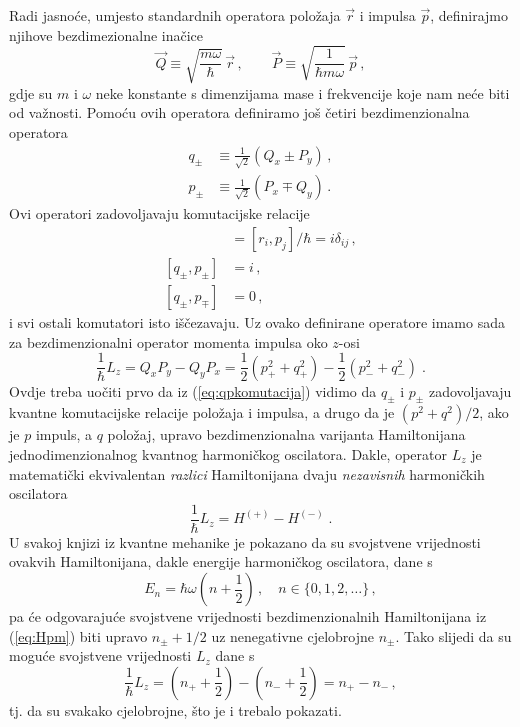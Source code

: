 Radi jasnoće, umjesto standardnih operatora položaja $\vec{r}$
i impulsa $\vec{p}$, definirajmo njihove bezdimezionalne inačice
\begin{equation}
    \vec{Q} \equiv \sqrt{\frac{m \omega}{\hbar}} \,\vec{r} \,, \qquad
    \vec{P} \equiv \sqrt{\frac{1}{\hbar m \omega}} \, \vec{p} \,,
\end{equation}
gdje su $m$ i $\omega$ neke konstante s dimenzijama mase i frekvencije
koje nam neće biti od važnosti. Pomoću ovih operatora definiramo 
još četiri bezdimenzionalna operatora
\begin{align}
    q_{\pm}& \equiv \frac{1}{\sqrt{2}} (Q_x \pm P_y) \,, \\
    p_{\pm}& \equiv \frac{1}{\sqrt{2}} (P_x \mp Q_y) \,.
\end{align}
Ovi operatori zadovoljavaju komutacijske relacije
\begin{align}
    [Q_i, P_j]& =  [r_i, p_j] / \hbar = i \delta_{ij} \,, \\
    [q_{\pm}, p_{\pm}]& = i \,, \label{eq:qpkomutacija}\\
    [q_{\pm}, p_{\mp}]& = 0 \,,
\end{align}
i svi ostali komutatori isto iščezavaju. Uz ovako definirane
operatore imamo sada za bezdimenzionalni operator momenta impulsa
oko $z$-osi
\begin{equation}
    \frac{1}{\hbar} L_z = Q_x P_y - Q_y P_x = \frac{1}{2}(p_{+}^2 + q_{+}^2)
                   - \frac{1}{2}(p_{-}^2 + q_{-}^2) \;.
\end{equation}
Ovdje treba uočiti prvo da iz (\ref{eq:qpkomutacija}) vidimo da
$q_{\pm}$ i $p_{\pm}$ zadovoljavaju kvantne komutacijske relacije položaja
i impulsa, a drugo da je $(p^2 + q^2)/2$, ako je $p$ impuls, a $q$ položaj,
upravo bezdimenzionalna varijanta Hamiltonijana jednodimenzionalnog kvantnog
harmoničkog oscilatora. Dakle, operator $L_z$ je matematički ekvivalentan
\emph{razlici} Hamiltonijana dvaju \emph{nezavisnih} harmoničkih oscilatora
\begin{equation}
\frac{1}{\hbar} L_z = H^{(+)} - H^{(-)} \;.
\label{eq:Hpm}
\end{equation}
U svakoj knjizi iz kvantne mehanike je pokazano
da su svojstvene vrijednosti ovakvih Hamiltonijana, dakle energije harmoničkog
oscilatora, dane s 
\begin{equation}
    E_n = \hbar \omega \left(n + \frac{1}{2}\right)\,, 
    \quad n \in \{0, 1, 2, \ldots\} \,,
\end{equation}
pa će odgovarajuće svojstvene vrijednosti bezdimenzionalnih Hamiltonijana
iz (\ref{eq:Hpm}) biti upravo $n_{\pm} + 1/2$ uz nenegativne
cjelobrojne $n_{\pm}$. Tako slijedi da su moguće svojstvene vrijednosti
$L_z$ dane s
\begin{equation}
    \frac{1}{\hbar} L_z = \left(n_{+} + \frac{1}{2}\right) -
    \left(n_{-} + \frac{1}{2}\right) = n_{+} - n_{-} \,,
\end{equation}
tj. da su svakako cjelobrojne, što je i trebalo pokazati.

